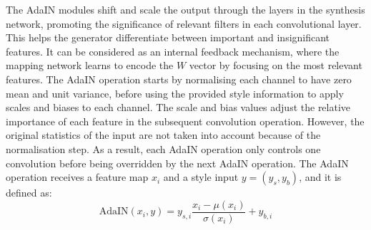 The AdaIN modules shift and scale the output through the layers in the synthesis network, promoting the significance of relevant filters in each convolutional layer. This helps the generator differentiate between important and insignificant features. It can be considered as an internal feedback mechanism, where the mapping network learns to encode the $W$ vector by focusing on the most relevant features. 
The AdaIN operation starts by normalising each channel to have zero mean and unit variance, before using the provided style information to apply scales and biases to each channel. The scale and bias values adjust the relative importance of each feature in the subsequent convolution operation. However, the original statistics of the input are not taken into account because of the normalisation step. As a result, each AdaIN operation only controls one convolution before being overridden by the next AdaIN operation.
The AdaIN operation receives a feature map $x_i$ and a style input $y=(y_s,y_b)$, and it is defined as:
\begin{equation}
    \mbox{AdaIN}(x_i,y)=y_{s,i}\frac{x_i - \mu (x_i)}{\sigma(x_i)}+y_{b,i}
\end{equation}

